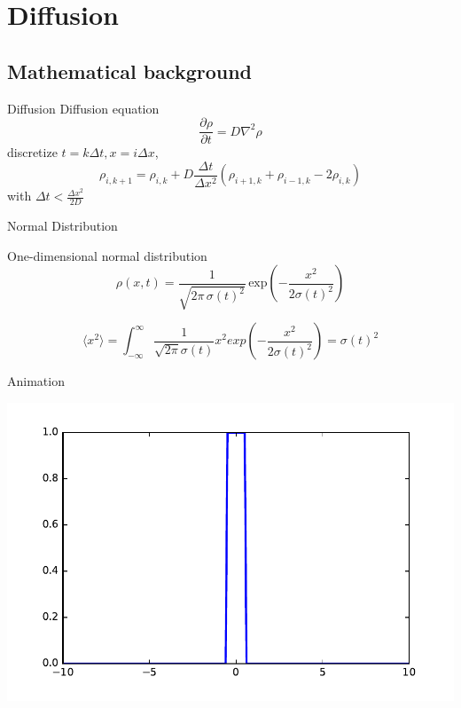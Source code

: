 \documentclass{beamer}
\begin{document}

\section{Diffusion}


\subsection{Mathematical background}

\begin{frame}{Diffusion}
\quad Diffusion equation
\begin{equation}
\frac{\partial\rho}{\partial t}=D\nabla^2\rho
\end{equation}
\quad discretize $t=k\Delta t, x=i\Delta x$,
\begin{equation}
\rho_{i,k+1}=\rho_{i,k}+D\frac{\Delta t}{\Delta x^2}(\rho_{i+1,k}+\rho_{i-1,k}-2\rho_{i,k})
\end{equation}
\quad \quad with $\Delta t<\frac{\Delta x^2}{2D}$
\end{frame}

\begin{frame}{Normal Distribution}

One-dimensional normal distribution
\begin{equation}
	\rho(x,t) = \frac{1}{\sqrt{2 \pi \, \sigma(t)^2}} \, \text{exp} \left( - \frac{x^2}{2\sigma(t)^2} \right)
\end{equation}

\begin{equation}
\langle x^2\rangle=\int_{-\infty}^{\infty}\frac{1}{\sqrt{2\pi}\sigma(t)}x^2exp(-\frac{x^2}{2\sigma(t)^2})=\sigma(t)^2
\end{equation}
\end{frame}


\begin{frame}{Animation}
\begin{center}
\href{run:./diffusion.mp4}{
\includegraphics[scale=0.65]{initial.pdf}}
\end{center}
\end{frame}
\end{document}
